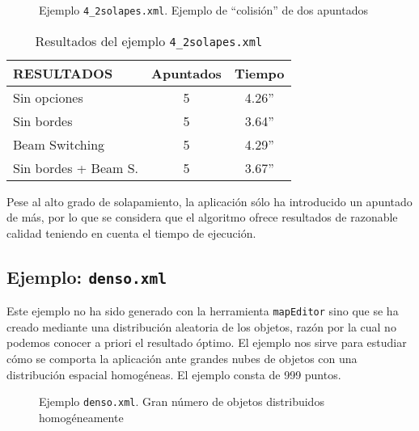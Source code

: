 \begin{figure}[!htb]
\centering
{}
\caption{Ejemplo \texttt{4\_2solapes.xml}. Ejemplo de ``colisión'' de dos apuntados}
\end{figure}

\begin{table*}[!ht]
\centering
\begin{tabular}{||l||c|c||}
\hline
\hline
RESULTADOS & Apuntados & Tiempo \\
\hline
\hline
Sin opciones & 5 & 4.26'' \\
\hline
Sin bordes & 5 & 3.64'' \\
\hline
Beam Switching & 5 & 4.29'' \\
\hline
Sin bordes + Beam S. & 5 & 3.67'' \\
\hline
\hline
\end{tabular}
\caption{Resultados del ejemplo \texttt{4\_2solapes.xml}}
\end{table*}

Pese al alto grado de solapamiento, la aplicación sólo ha introducido un
apuntado de más, por lo que se considera que el algoritmo ofrece resultados de razonable calidad
teniendo en cuenta el tiempo de ejecución.

\subsection {Ejemplo: \texttt{denso.xml}}
Este ejemplo no ha sido generado con la herramienta \texttt{mapEditor} sino que se
ha creado mediante una distribución aleatoria de los objetos, razón por la cual no podemos conocer a priori el
resultado óptimo. 
El ejemplo nos sirve para estudiar cómo se comporta la aplicación 
ante grandes nubes de objetos con una distribución espacial homogéneas. 
El ejemplo consta de 999 puntos.

\begin{figure}[!htb]
\centering
{}
\caption{Ejemplo \texttt{denso.xml}. Gran número de objetos distribuidos homogéneamente}
\end{figure}

